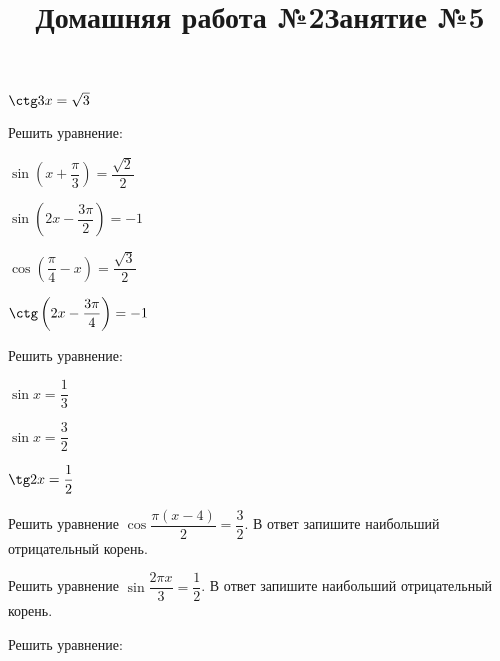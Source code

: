 \begin{listofex}
\begin{enumcols}[itemcolumns=3]
		\item \( \ctg 3x = \sqrt{3} \)
	\end{enumcols}
	\item Решить уравнение:
	\begin{enumcols}[itemcolumns=2]
		\item \( \sin \left( x+\dfrac{\pi}{3} \right) = \dfrac{\sqrt{2}}{2} \)
		\item \( \sin \left( 2x-\dfrac{3\pi}{2} \right) = -1 \)
		\item \( \cos \left( \dfrac{\pi}{4}-x \right)=\dfrac{\sqrt{3}}{2} \)
		\item \( \ctg\left( 2x-\dfrac{3\pi}{4} \right)=-1 \)
	\end{enumcols}
	\item Решить уравнение:
	\begin{enumcols}[itemcolumns=3]
		\item \( \sin x = \dfrac{1}{3} \)
		\item \( \sin x = \dfrac{3}{2}\)
		\item \( \tg 2x = \dfrac{1}{2}\)
	\end{enumcols}
	\item Решить уравнение \( \cos\dfrac{\pi(x-4)}{2}=\dfrac{3}{2} \). В ответ запишите наибольший отрицательный корень.
	\item Решить уравнение \( \sin\dfrac{2\pi x}{3}=\dfrac{1}{2} \). В ответ запишите наибольший отрицательный корень.
\end{listofex}
\newpage
\title{Домашняя работа №2}
\begin{listofex}
	\item Решить уравнение:
	\begin{enumcols}[itemcolumns=2]
		\item {}
		\item {}
		\item {}
		\item {}
		\item {}
		\item {}
		\item {}
	\end{enumcols}
\end{listofex}
\newpage
\title{Занятие №5}
